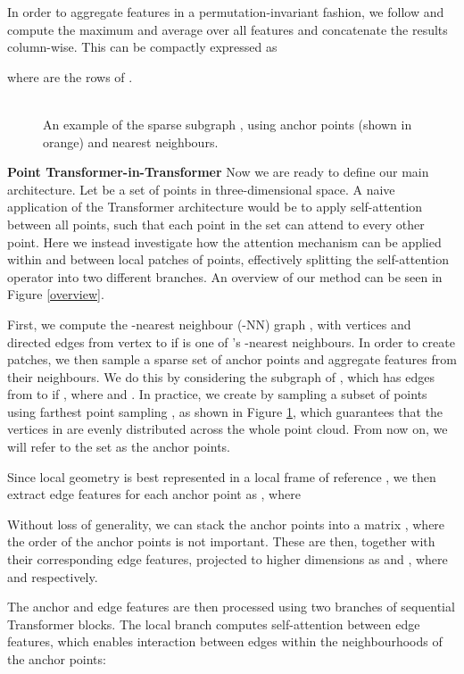 \documentclass[a4paper,conference]{IEEEtran}
\begin{document}
In order to aggregate features in a permutation-invariant fashion, we follow \cite{wang2019dynamic} and compute the maximum and average over all features and concatenate the results column-wise. This can be compactly expressed as 


where  are the rows of . \\~\

\begin{figure}
  \centering
  \smallskip
  
  \caption{An example of the sparse subgraph , using  anchor points (shown in orange) and  nearest neighbours.}
  \label{graph}
\end{figure}

\noindent \textbf{Point Transformer-in-Transformer} Now we are ready to define our main architecture. Let   be a set of  points in three-dimensional space. A naive application of the Transformer architecture would be to apply self-attention between all points, such that each point in the set can attend to every other point. Here we instead investigate how the attention mechanism can be applied within and between local patches of points, effectively splitting the self-attention operator into two different branches. An overview of our method can be seen in Figure \ref{overview}.

First, we compute the -nearest neighbour (-NN) graph , with vertices  and directed edges  from vertex  to  if  is one of 's -nearest neighbours. In order to create patches, we then sample a sparse set of  anchor points and aggregate features from their neighbours. We do this by considering the subgraph  of , which has edges from  to  if , where  and . In practice, we create  by sampling a subset of points using farthest point sampling \cite{eldar1997farthest}, as shown in Figure \ref{graph}, which guarantees that the vertices in  are evenly distributed across the whole point cloud. From now on, we will refer to the set  as the anchor points.

Since local geometry is best represented in a local frame of reference \cite{wang2019dynamic}, we then extract edge features for each anchor point as , where



Without loss of generality, we can stack the anchor points into a matrix , where the order of the anchor points is not important. These are then, together with their corresponding edge features, projected to higher dimensions as  and , where  and  respectively. 

The anchor and edge features are then processed using two branches of  sequential Transformer blocks. The local branch computes self-attention between edge features, which enables interaction between edges within the neighbourhoods of the anchor points:
\end{document}
